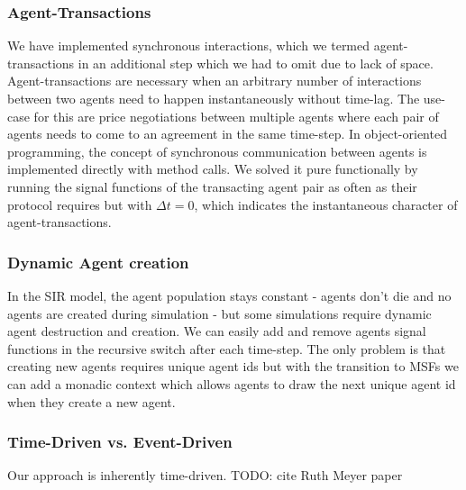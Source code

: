 \subsubsection{Agent-Transactions}
We have implemented synchronous interactions, which we termed agent-transactions in an additional step which we had to omit due to lack of space. Agent-transactions are necessary when an arbitrary number of interactions between two agents need to happen instantaneously without time-lag. The use-case for this are price negotiations between multiple agents where each pair of agents needs to come to an agreement in the same time-step. In object-oriented programming, the concept of synchronous communication between agents is implemented directly with method calls. We solved it pure functionally by running the signal functions of the transacting agent pair as often as their protocol requires but with $\Delta t=0$, which indicates the instantaneous character of agent-transactions.

\subsubsection{Dynamic Agent creation}
In the SIR model, the agent population stays constant - agents don't die and no agents are created during simulation - but some simulations \cite{epstein_growing_1996} require dynamic agent destruction and creation. We can easily add and remove agents signal functions in the recursive switch after each time-step. The only problem is that creating new agents requires unique agent ids but with the transition to MSFs we can add a monadic context which allows agents to draw the next unique agent id when they create a new agent. %

\subsubsection{Time-Driven vs. Event-Driven}
Our approach is inherently time-driven. TODO: cite Ruth Meyer paper

%